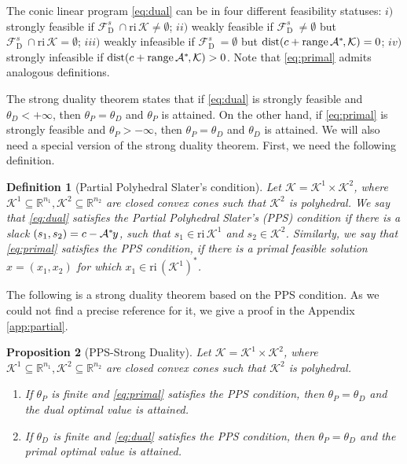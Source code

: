 \documentclass{article}
\newcommand{\reInt}{\mathrm{ri}\,}
\newcommand{\feasS}{\mathcal{F}_{\text{D }}^s}
\newcommand{\stdMap}{ {\mathcal{A}}}
\newcommand{\stdCone}{ {\mathcal{K}}}
\newcommand{\pOpt}{ {\theta _P}}
\newcommand{\dOpt}{ {\theta _D}}
\newcommand{\matRange}{{\mathrm{ range } \,}}
\renewcommand{\Re}{\mathbb{R}}
\newcommand{\PPS}{{PPS}}
\newcommand{\T}{\ast\hspace{-1pt}}
\newtheorem{definition}{Definition}
\newtheorem{proposition}[definition]{Proposition}
\begin{document}
The conic linear program \eqref{eq:dual} can be in four different feasibility 
statuses: $i)$ strongly feasible if $\feasS \cap \reInt \stdCone \neq \emptyset$; $ii)$ weakly feasible if 
$\feasS \neq \emptyset$ but $\feasS \cap \reInt \stdCone  = \emptyset$; $iii)$ weakly infeasible if 
$\feasS = \emptyset$ but $\text{dist}(c + \matRange \stdMap^\T ,\stdCone) = 0$; $iv)$ strongly 
infeasible if $\text{dist}(c + \matRange \stdMap^\T ,\stdCone) > 0$.  Note that 
\eqref{eq:primal} admits analogous definitions. 

The 
strong duality theorem states that if \eqref{eq:dual} is strongly feasible and 
$\dOpt < + \infty$, then $\pOpt = \dOpt$ and $\pOpt$ is attained. 
On the other hand, if \eqref{eq:primal} is strongly feasible and 
$\pOpt > -\infty$,  then $\pOpt = \dOpt$ and $\dOpt$ is attained. 
We  will also need a special version of the strong duality theorem. 
First, we need the following definition.

\begin{definition}[Partial Polyhedral Slater's condition]\label{def:pps}
	Let $\stdCone = \stdCone ^1\times \stdCone ^2$, where  $\stdCone ^1\subseteq \Re^{n_1},\stdCone ^2 \subseteq \Re^{n_2}$ are closed convex cones such that $\stdCone ^2$ is polyhedral.
	We say that \eqref{eq:dual} satisfies the Partial Polyhedral Slater's (\PPS) condition if there is 
	a slack $(s_1,s_2) = c-\stdMap^\T y$, such that $s_1 \in \reInt \stdCone^1$ and $s_2 \in \stdCone^2$.
	Similarly, we say that \eqref{eq:primal} satisfies the {\PPS} condition, if there is a primal 
	feasible solution $x = (x_1,x_2)$ for which $x_1 \in \reInt (\stdCone^1)^*$.
\end{definition}
The following is a strong duality theorem based on the {\PPS} condition.
As we could not find a precise reference for it, we give a proof in the Appendix \ref{app:partial}.  
\begin{proposition}[{\PPS}-Strong Duality]\label{prop:slater2}
	Let $\stdCone = \stdCone ^1\times \stdCone ^2$, where  $\stdCone ^1\subseteq \Re^{n_1},\stdCone ^2 \subseteq \Re^{n_2}$ are closed convex cones such that $\stdCone ^2$ is polyhedral.
	\begin{enumerate}[label=(\roman*)]
		\item If $\pOpt$ is finite and \eqref{eq:primal} satisfies the {\PPS} condition, then $\pOpt = \dOpt$ and the dual optimal value is attained.
		\item If $\dOpt$ is finite and \eqref{eq:dual} satisfies the {\PPS} condition, then $\pOpt = \dOpt$ and the primal 
		optimal value is attained.
	\end{enumerate}
\end{proposition}
\end{document}
